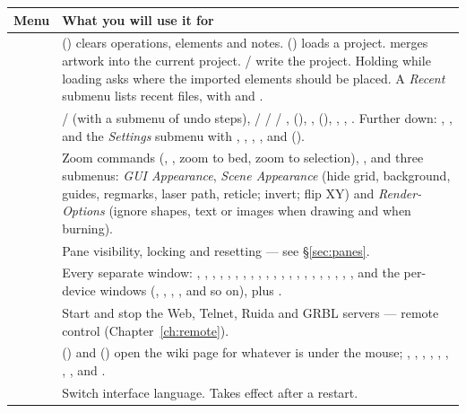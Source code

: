 \begin{center}\small
\begin{tabular}{@{}L{2.1cm}L{13.2cm}@{}}
\toprule
\textbf{Menu} & \textbf{What you will use it for} \\
\midrule
{} &
 () clears operations, elements and notes.
 () loads a project.
 merges artwork into the current project.
 /  write the project.
Holding  while loading asks where the imported elements should be
placed. A \emph{Recent} submenu lists recent files, with  and . \\
 &
 /  (with a submenu of undo steps),
 /  /  / ,
 (), ,
 (), ,
, . Further down: ,
, and the \emph{Settings} submenu with
, , ,
,  and  (). \\
 &
Zoom commands (, ,  zoom to bed,
 zoom to selection), , and three submenus:
\emph{GUI Appearance}, \emph{Scene Appearance} (hide grid, background, guides,
regmarks, laser path, reticle; invert; flip XY) and \emph{Render-Options}
(ignore shapes, text or images when drawing and when burning). \\
 & Pane visibility, locking and resetting --- see \S\ref{sec:panes}. \\
 & Every separate window: , ,
, , , ,
, , , ,
, , , ,
, , ,
, , ,
,  and the per-device windows
(, , , , and so on),
plus . \\
 & Start and stop the Web, Telnet, Ruida and GRBL servers ---
remote control (Chapter~\ref{ch:remote}). \\
 &  () and  () open
the wiki page for whatever is under the mouse; ,
, , , ,
, , ,
 and . \\
 & Switch interface language. Takes effect after a restart. \\
\bottomrule
\end{tabular}
\end{center}

